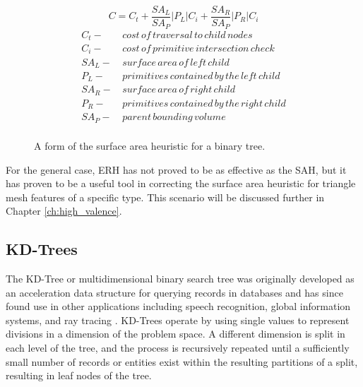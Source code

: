 \begin{figure}[H]
  \begin{equation}
    C =  C_{t} + \frac{SA_{L}}{SA_{P}} |P_{L}|C_{i} +  \frac{SA_{R}}{SA_{P}} |P_{R}|C_{i}
    \label{eq:SAH}
  \end{equation}
  \begin{align*}
    C_{t} - & \,cost\, of\, traversal\, to\, child\, nodes \\
    C_{i} - & \, cost\, of\, primitive\, intersection\, check\, \\
    SA_{L} - &  \,surface\, area\, of\, left\, child \\
    P_{L} - & \, primitives\, contained\, by\, the\, left\, child  \\
    SA_{R} - & \, surface\, area\, of\, right\, child \\
    P_{R} - & \, primitives\, contained\, by\, the\, right\, child \\
    SA_{P} - & \, parent\, bounding\, volume \\
  \end{align*}
  \caption{A form of the surface area heuristic for a binary tree.}
  \label{fig:SAH}
\end{figure}

For the general case, ERH has not proved to be as effective as the SAH, but it
has proven to be a useful tool in correcting the surface area heuristic for
triangle mesh features of a specific type. This scenario will be discussed further
in Chapter \ref{ch:high_valence}.

\subsection{KD-Trees}
\label{subsec:kd-trees}
The KD-Tree or multidimensional binary search tree was originally developed as
an acceleration data structure for querying records in databases and has since
found use in other applications including speech recognition, global information
systems, and ray tracing \cite{Bentley_1975}. KD-Trees operate by using single
values to represent divisions in a dimension of the problem space. A different
dimension is split in each level of the tree, and the process is recursively
repeated until a sufficiently small number of records or entities exist within
the resulting partitions of a split, resulting in leaf nodes of the tree.

